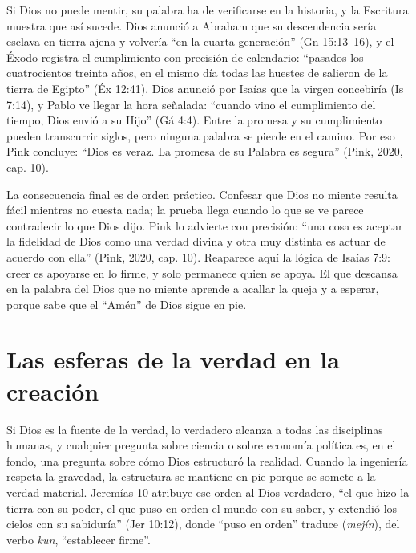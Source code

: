 Si Dios no puede mentir, su palabra ha de verificarse en la historia, y la Escritura muestra que así sucede. Dios anunció a Abraham que su descendencia sería esclava en tierra ajena y volvería ``en la cuarta generación'' (Gn 15:13--16), y el Éxodo registra el cumplimiento con precisión de calendario: ``pasados los cuatrocientos treinta años, en el mismo día todas las huestes de \SENOR{} salieron de la tierra de Egipto'' (Éx 12:41). Dios anunció por Isaías que la virgen concebiría (Is 7:14), y Pablo ve llegar la hora señalada: ``cuando vino el cumplimiento del tiempo, Dios envió a su Hijo'' (Gá 4:4). Entre la promesa y su cumplimiento pueden transcurrir siglos, pero ninguna palabra se pierde en el camino. Por eso Pink concluye: ``Dios es veraz. La promesa de su Palabra es segura'' (Pink, 2020, cap. 10).

La consecuencia final es de orden práctico. Confesar que Dios no miente resulta fácil mientras no cuesta nada; la prueba llega cuando lo que se ve parece contradecir lo que Dios dijo. Pink lo advierte con precisión: ``una cosa es aceptar la fidelidad de Dios como una verdad divina y otra muy distinta es actuar de acuerdo con ella'' (Pink, 2020, cap. 10). Reaparece aquí la lógica de Isaías 7:9: creer es apoyarse en lo firme, y solo permanece quien se apoya. El que descansa en la palabra del Dios que no miente aprende a acallar la queja y a esperar, porque sabe que el ``Amén'' de Dios sigue en pie.


\section{Las esferas de la verdad en la creación}

Si Dios es la fuente de la verdad, lo verdadero alcanza a todas las disciplinas humanas, y cualquier pregunta sobre ciencia o sobre economía política es, en el fondo, una pregunta sobre cómo Dios estructuró la realidad. Cuando la ingeniería respeta la gravedad, la estructura se mantiene en pie porque se somete a la verdad material. Jeremías 10 atribuye ese orden al Dios verdadero, ``el que hizo la tierra con su poder, el que puso en orden el mundo con su saber, y extendió los cielos con su sabiduría'' (Jer 10:12), donde ``puso en orden'' traduce  (\emph{mejín}), del verbo \emph{kun}, ``establecer firme''.

